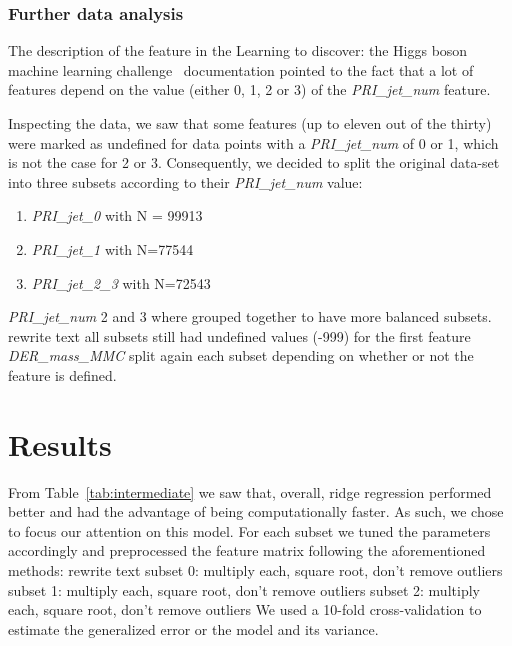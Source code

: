 \documentclass[10pt,conference,compsocconf]{IEEEtran}
\begin{document}
\subsubsection{Further data analysis}
The description of the feature in the Learning to discover: the Higgs
boson machine learning challenge~\cite{higgsMLdoc} documentation pointed 
to the fact that a lot of features depend on the value (either 0, 1, 2 or 3)
of the \textit{PRI\_jet\_num} feature.

Inspecting the data, we saw that some features (up to eleven out of the thirty) 
were marked as undefined for data points with a \textit{PRI\_jet\_num} of 0 or 1, 
which is not the case for 2 or 3. Consequently, we decided to split the 
original data-set into three subsets according to their \textit{PRI\_jet\_num} value: 
\begin{enumerate}
    \item \textit{PRI\_jet\_0} with N = 99913
    \item \textit{PRI\_jet\_1} with N=77544
    \item \textit{PRI\_jet\_2\_3} with N=72543
\end{enumerate}
\textit{PRI\_jet\_num} 2 and 3 where grouped together to have more 
balanced subsets.
rewrite text
all subsets still had undefined values (-999) for the first feature \textit{DER\_mass\_MMC} split again each subset
depending on whether or not the feature is defined.

\section{Results}
From Table~\ref{tab:intermediate} we saw that, overall, ridge regression
performed better and had the advantage of being computationally faster.
As such, we chose to focus our attention on this model. For each subset we
tuned the parameters accordingly and preprocessed the feature matrix 
following the aforementioned methods: 
rewrite text
subset 0: multiply each, square root, don't remove outliers
subset 1: multiply each, square root, don't remove outliers
subset 2: multiply each, square root, don't remove outliers
We used a 10-fold cross-validation to estimate the generalized error or the 
model and its variance.
\end{document}

